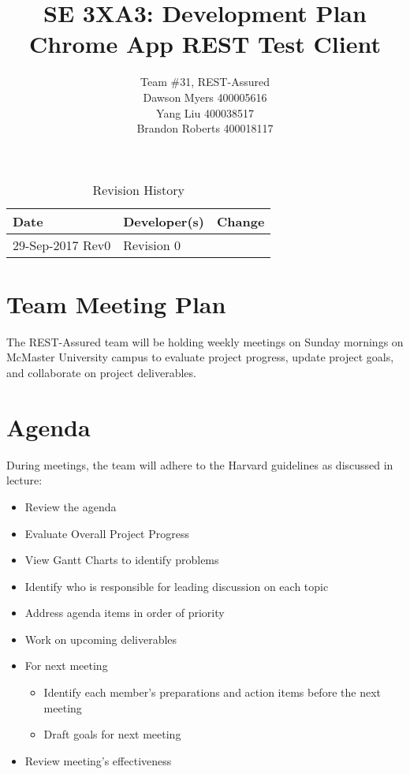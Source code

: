 \documentclass{article}
\title{SE 3XA3: Development Plan\\Chrome App REST Test Client}
\author{Team \#31, REST-Assured
		\\ Dawson Myers 400005616
		\\ Yang Liu 400038517
		\\ Brandon Roberts 400018117
}
\date{}
\begin{document}
\begin{table}[hp]
\caption{Revision History} \label{TblRevisionHistory}
\begin{tabularx}{\textwidth}{llX}
\toprule
\textbf{Date} & \textbf{Developer(s)} & \textbf{Change}\\
\midrule
29-Sep-2017 Rev0 & Revision 0\\
\bottomrule
\end{tabularx}
\end{table}

\newpage

\maketitle


\section{Team Meeting Plan}
The REST-Assured team will be holding weekly meetings on Sunday mornings on McMaster University campus to evaluate project progress, update project goals, and collaborate on project deliverables. 

\section{Agenda}
During meetings, the team will adhere to the Harvard guidelines as discussed in lecture:
\begin{itemize}
\item Review the agenda
\item Evaluate Overall Project Progress
\item View Gantt Charts to identify problems
\item Identify who is responsible for leading discussion on each topic
\item Address agenda items in order of priority 
\item Work on upcoming deliverables
\item For next meeting
\begin{itemize}
    \item Identify each member’s preparations and action items before the next meeting
    \item Draft goals for next meeting
\end{itemize}
\item Review meeting’s effectiveness
\end{itemize}
\end{document}
